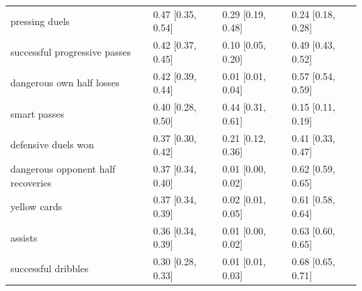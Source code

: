 \begin{longtable}{llll}
pressing duels & 0.47 [0.35, 0.54] & 0.29 [0.19, 0.48] & 0.24 [0.18, 0.28]\\
successful progressive passes & 0.42 [0.37, 0.45] & 0.10 [0.05, 0.20] & 0.49 [0.43, 0.52]\\
dangerous own half losses & 0.42 [0.39, 0.44] & 0.01 [0.01, 0.04] & 0.57 [0.54, 0.59]\\
smart passes & 0.40 [0.28, 0.50] & 0.44 [0.31, 0.61] & 0.15 [0.11, 0.19]\\
defensive duels won & 0.37 [0.30, 0.42] & 0.21 [0.12, 0.36] & 0.41 [0.33, 0.47]\\
dangerous opponent half recoveries & 0.37 [0.34, 0.40] & 0.01 [0.00, 0.02] & 0.62 [0.59, 0.65]\\
yellow cards & 0.37 [0.34, 0.39] & 0.02 [0.01, 0.05] & 0.61 [0.58, 0.64]\\
assists & 0.36 [0.34, 0.39] & 0.01 [0.00, 0.02] & 0.63 [0.60, 0.65]\\
successful dribbles & 0.30 [0.28, 0.33] & 0.01 [0.01, 0.03] & 0.68 [0.65, 0.71]\\
\end{longtable}
